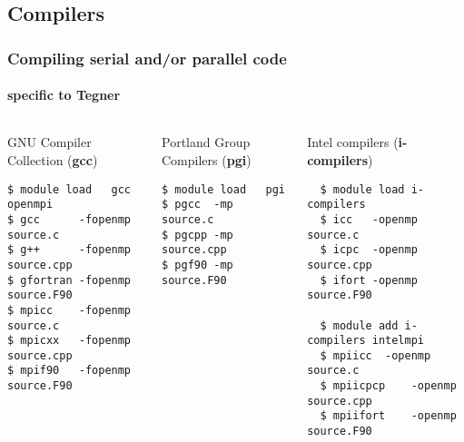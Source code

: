 \subsection{Compilers}
\begin{frame}[fragile]
\frametitle{Compiling serial and/or parallel code}
\framesubtitle{specific to \alert{Tegner}}

\begin{columns}[t]
\begin{exampleblock}{GNU Compiler Collection (\textbf{gcc})}
  \scriptsize
  \begin{verbatim}
$ module load 	gcc openmpi
$ gcc	   -fopenmp source.c
$ g++	   -fopenmp source.cpp
$ gfortran -fopenmp source.F90
$ mpicc	   -fopenmp source.c
$ mpicxx   -fopenmp source.cpp
$ mpif90   -fopenmp source.F90
  \end{verbatim}
  \end{exampleblock}

  \begin{exampleblock}{Portland Group Compilers (\textbf{pgi}) }
  \scriptsize
  \begin{verbatim}
$ module load 	pgi
$ pgcc  -mp source.c
$ pgcpp -mp source.cpp
$ pgf90 -mp source.F90
  \end{verbatim}
  \end{exampleblock}


  \begin{exampleblock}{Intel compilers (\textbf{i-compilers})}
  \scriptsize
  \begin{verbatim}
  $ module load i-compilers
  $ icc   -openmp source.c	
  $ icpc  -openmp source.cpp
  $ ifort -openmp source.F90

  $ module add i-compilers intelmpi
  $ mpiicc 	-openmp source.c
  $ mpiicpcp 	-openmp source.cpp
  $ mpiifort 	-openmp source.F90
  \end{verbatim}
  \end{exampleblock}
\end{columns}
\end{frame}

